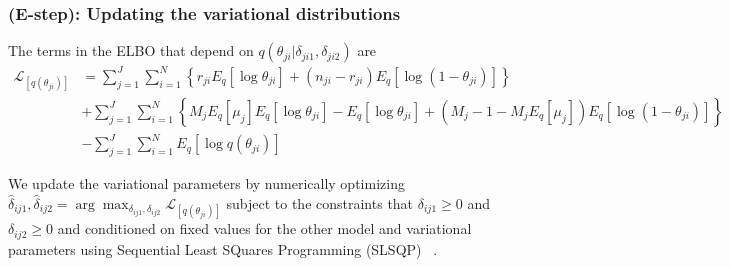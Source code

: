 \documentclass[11pt,reqno]{amsart}
\begin{document}
\subsubsection{(E-step): Updating the variational distributions}
The terms in the ELBO that depend on $q(\theta_{ji} | \delta_{ji1}, \delta_{ji2})$ are
\begin{equation}\label{eqn:partial_theta}
\begin{split}
\mathcal{L}_{{[q(\theta_{ji})]}}
& = \sum_{j=1}^{J} \sum_{i=1}^{N} \left\lbrace r_{ji} E_q \left[ \log \theta_{ji} \right] + (n_{ji} - r_{ji}) E_q  \left[  \log (1 - \theta_{ji}) \right] \right\rbrace\\
& +  \sum_{j=1}^{J} \sum_{i=1}^{N} \left\lbrace M_j E_q \left[ \mu_j \right] E_q \left[ \log \theta_{ji} \right] - E_q  \left[ \log \theta_{ji} \right] + \left( M_j - 1 - M_j E_q\left[ \mu_j \right]  \right) E_q\left[ \log \left( 1 - \theta_{ji}\right) \right] \right\rbrace\\
& - \sum_{j=1}^{J}\sum_{i=1}^{N} E_q\left[ \log q(\theta_{ji})\right]
\end{split}
\end{equation}

We update the variational parameters by numerically optimizing $\hat{\delta}_{ij1}, \hat{\delta}_{ij2} = \arg \max_{\delta_{ij1}, \delta_{ij2}} \mathcal{L}_{{[q(\theta_{ji})]}}$ subject to the constraints that $\delta_{ij1} \geq 0$ and $\delta_{ij2} \geq 0$ and conditioned on fixed values for the other model and variational parameters using Sequential Least SQuares Programming (SLSQP) ~\citep{kraft1988software}.
\end{document}
